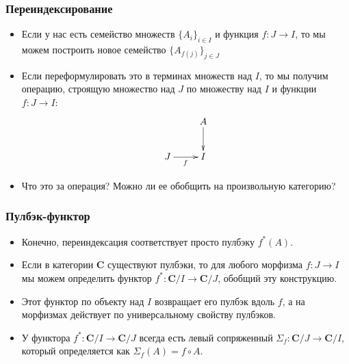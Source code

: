 \documentclass{beamer}
\theoremstyle{definition}
\newcommand{\cat}[1]{\mathbf{#1}}
\renewcommand{\C}{\cat{C}}
\begin{document}
\begin{frame}
\frametitle{Переиндексирование}
\begin{itemize}
\item Если у нас есть семейство множеств $\{ A_i \}_{i \in I}$ и функция $f : J \to I$, то мы можем построить новое семейство $\{ A_{f(j)} \}_{j \in J}$
\item Если переформулировать это в терминах множеств над $I$, то мы получим операцию, строящую множество над $J$ по множеству над $I$ и функции $f : J \to I$:
\[ \xymatrix{            & A \ar[d] \\
              J \ar[r]_f & I
            } \]
\item Что это за операция? Можно ли ее обобщить на произвольную категорию?
\end{itemize}
\end{frame}

\begin{frame}
\frametitle{Пулбэк-функтор}
\begin{itemize}
\item Конечно, переиндексация соответствует просто пулбэку $f^*(A)$.
\item Если в категории $\C$ существуют пулбэки, то для любого морфизма $f : J \to I$ мы можем определить функтор $f^* : \C/I \to \C/J$, обобщий эту конструкцию.
\item Этот функтор по объекту над $I$ возвращает его пулбэк вдоль $f$, а на морфизмах действует по универсальному свойству пулбэков.
\item У функтора $f^* : \C/I \to \C/J$ всегда есть левый сопряженный $\Sigma_f : \C/J \to \C/I$, который определяется как $\Sigma_f(A) = f \circ A$.
\end{itemize}
\end{frame}
\end{document}
